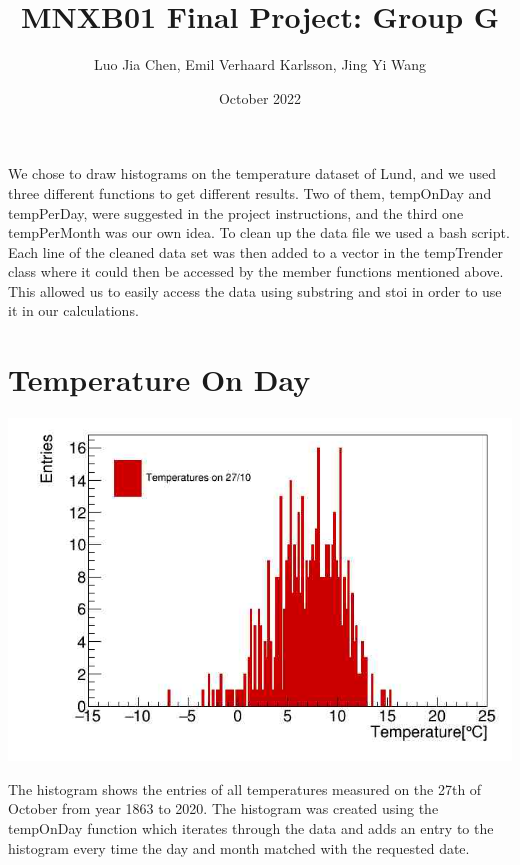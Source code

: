 \documentclass{article}
\title{MNXB01 Final Project: Group G}
\author{Luo Jia Chen, Emil Verhaard Karlsson, Jing Yi Wang}
\date{October 2022}
\begin{document}
\maketitle

We chose to draw histograms on the temperature dataset of Lund, and we used three different functions to get different results. Two of them, tempOnDay and tempPerDay, were suggested in the project instructions, and the third one tempPerMonth was our own idea. To clean up the data file we used a bash script. Each line of the cleaned data set was then added to a vector in the tempTrender class where it could then be accessed by the member functions mentioned above. This allowed us to easily access the data using substring and stoi in order to use it in our calculations.

\section{Temperature On Day}
\begin{center}
\includegraphics[scale=0.5]{tempOnDay}
\end{center}

The histogram shows the entries of all temperatures measured on the 27th of October from year 1863 to 2020. The histogram was created using the tempOnDay function which iterates through the data and adds an entry to the histogram every time the day and month matched with the requested date.  
\end{document}
